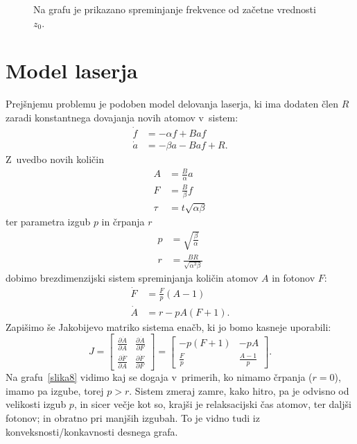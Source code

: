 \documentclass[a4paper,pdftex,10pt]{article}
\numberwithin{equation}{section} %
\numberwithin{figure}{section} %
\numberwithin{table}{section} %
\begin{document}
\begin{figure}    
    \centering
    \resizebox{0.8\textwidth}{!}{}
    \caption{Na grafu je prikazano spreminjanje frekvence od začetne vrednosti $z_0$.}
    \label{slika7}
\end{figure}

\newpage


\section{Model laserja}
Prejšnjemu problemu je podoben model delovanja laserja, ki ima dodaten člen $R$ zaradi 
konstantnega dovajanja novih atomov v~sistem:
\begin{align}\label{af}
    \dot{f} &= -\alpha f + Baf \\
    \dot{a} &= -\beta a - Baf + R.
\end{align}
Z~uvedbo novih količin 
\begin{align*}
    A &= \frac{B}{\alpha} a \\
    F &= \frac{B}{\beta} f \\
    \tau  &= t\sqrt{\alpha\beta}
\end{align*}
ter parametra izgub $p$ in črpanja $r$
\begin{align*}
    p &= \sqrt{\frac{\beta}{\alpha}} \\
    r &= \frac{BR}{\sqrt{\alpha^3\beta}}
\end{align*}
dobimo brezdimenzijski sistem spreminjanja količin atomov $A$ in fotonov $F$:
\begin{align}\label{laser}
    \dot{F} &= \frac{F}{p} \left(A - 1\right) \\
    \dot{A} &= r - pA\left(F + 1\right).
\end{align}
Zapišimo še Jakobijevo matriko sistema enačb, ki jo bomo kasneje uporabili:
\begin{equation}\label{Jacobi}
    J = \begin{bmatrix}
	\frac{\partial \dot{A}}{\partial A} 
	& \frac{\partial \dot{A}}{\partial F} \\
	\frac{\partial \dot{F}}{\partial A} 
	& \frac{\partial \dot{F}}{\partial F} 
    \end{bmatrix} = 
    \begin{bmatrix}
	-p(F+1) & -pA \\
	\frac{F}{p} & \frac{A-1}{p}
    \end{bmatrix}.
\end{equation}
Na grafu~\ref{slika8} vidimo kaj se dogaja v~primerih, ko nimamo črpanja ($r=0$), imamo pa 
izgube, torej $p>r$. Sistem zmeraj zamre, kako hitro, pa je odvisno od velikosti izgub
$p$, in sicer večje kot so, krajši je relaksacijski čas atomov, ter daljši fotonov; in 
obratno pri manjših izgubah. To je vidno tudi iz konveksnosti/konkavnosti desnega grafa.\\
\end{document}
